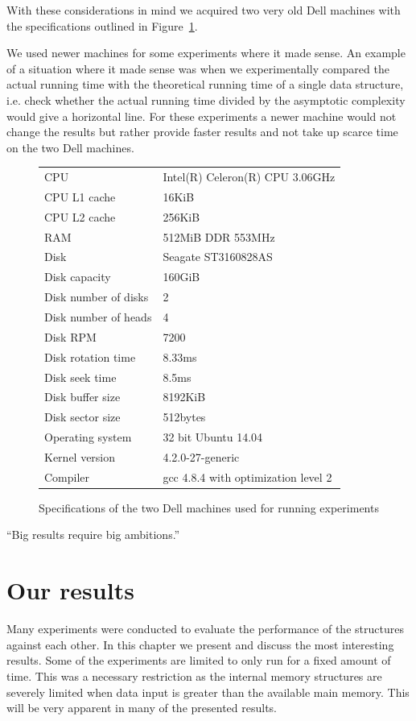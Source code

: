 \documentclass[twoside,11pt,openright]{report}
\begin{document}
With these considerations in mind we acquired two very old Dell machines with the specifications outlined in Figure~\ref{fig:pc_specs}.

We used newer machines for some experiments where it made sense. An example of a situation where it made sense was when we experimentally compared the actual running time with the theoretical running time of a single data structure, i.e. check whether the actual running time divided by the asymptotic complexity would give a horizontal line. For these experiments a newer machine would not change the results but rather provide faster results and not take up scarce time on the two Dell machines.

\begin{figure}[h]
\centering
\begin{tabular}{ll}
CPU & Intel(R) Celeron(R) CPU 3.06GHz \\
CPU L1 cache & 16KiB \\
CPU L2 cache & 256KiB \\
RAM & 512MiB DDR 553MHz \\
Disk & Seagate ST3160828AS \\
Disk capacity & 160GiB \\
Disk number of disks & 2 \\
Disk number of heads & 4 \\
Disk RPM & 7200 \\
Disk rotation time & 8.33ms \\
Disk seek time & 8.5ms \\
Disk buffer size & 8192KiB \\
Disk sector size & 512bytes \\
Operating system & 32 bit Ubuntu 14.04 \\
Kernel version & 4.2.0-27-generic \\
Compiler & gcc 4.8.4 with optimization level 2
\end{tabular}
\caption{Specifications of the two Dell machines used for running experiments}
\label{fig:pc_specs}
\end{figure}

\begin{savequote}[0.4\textwidth]
``Big results require big ambitions.''
\end{savequote}
\chapter{Our results}
\label{chp:experimental_results}
Many experiments were conducted to evaluate the performance of the structures against each other. In this chapter we present and discuss the most interesting results. Some of the experiments are limited to only run for a fixed amount of time. This was a necessary restriction as the internal memory structures are severely limited when data input is greater than the available main memory. This will be very apparent in many of the presented results.
\end{document}
